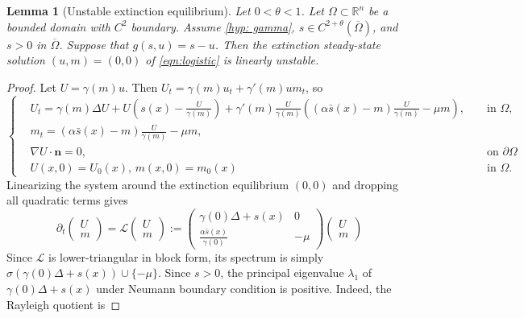 \documentclass{article}
\newtheorem{lemma}[theorem]{Lemma}
\begin{document}
\begin{lemma}[Unstable extinction equilibrium]
    Let $0<\theta<1$. Let $\Omega\subset \mathbb{R}^n$ be a bounded domain with $C^{2}$ boundary. Assume \eqref{hyp: gamma}, $s\in C^{2+\theta}(\overline{\Omega})$, and $s>0$ in $\overline \Omega$. Suppose that $g(s,u)=s-u$. Then the extinction steady-state solution $(u,m)=(0,0)$ of \eqref{eqn:logistic} is linearly unstable.
\end{lemma}
\begin{proof}
    Let $U=\gamma(m)u$. Then 
    $U_t = \gamma(m)u_t +\gamma'(m)um_t$, so
    \begin{equation}\label{eqn:modified}
        \left\{\begin{aligned}
            & U_t = \gamma(m)\Delta U +U\left(s(x)-\frac{U}{\gamma(m)}\right) + \gamma'(m)\frac{U}{\gamma(m)}\left((\alpha \bar s(x)-m)\frac{U}{\gamma(m)}-\mu m\right), && \text{ in }\Omega,\\
            & m_t = (\alpha \bar s(x) -m)\frac{U}{\gamma(m)} -\mu m,\\
            &\nabla U\cdot \textbf{n}=0, && \text{ on }\partial\Omega\\
            &U(x,0) = U_0(x),\,m(x,0) = m_0(x) && \text{ in } \Omega.
        \end{aligned}\right.
    \end{equation}  
    Linearizing the system around the extinction equilibrium $(0,0)$ and dropping all quadratic terms gives
    \begin{equation}\label{sys:linearized}
        \partial_t\begin{pmatrix}
            U\\m
        \end{pmatrix} = \mathcal{L}\begin{pmatrix}
            U\\m
        \end{pmatrix}:=\begin{pmatrix}
            \gamma(0)\Delta+s(x)&0\\ \frac{\alpha \bar s(x)}{\gamma(0)} &-\mu
\end{pmatrix}\begin{pmatrix}
            U\\m
        \end{pmatrix}
    \end{equation}
    Since $\mathcal{L}$ is lower-triangular in block form, its spectrum is simply $\sigma(\gamma(0)\Delta+ s(x))\cup\{-\mu\}$. 
    Since $s>0$, the principal eigenvalue $\lambda_1$ of $\gamma(0)\Delta +s(x)$ under Neumann boundary condition is positive. Indeed, the Rayleigh quotient is 

\end{proof}
\end{document}
